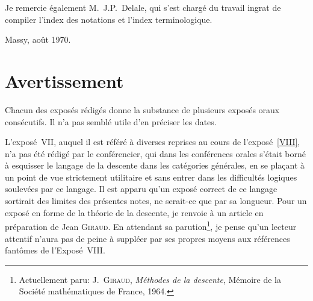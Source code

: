 Je remercie \'egalement M.\, J.P.\, Delale, qui s'est charg\'e du
travail ingrat de compiler l'index des notations et l'index
terminologique.

\bigskip\hfill Massy, ao\^ut 1970.

\cleardoublepage
\chapter*{Avertissement}
\thispagestyle{empty}
\label{I.avertissement}


Chacun des expos\'es r\'edig\'es donne la substance de plusieurs
expos\'es oraux cons\'ecutifs. Il n'a pas sembl\'e utile d'en
pr\'eciser les dates.

L'expos\'e~VII, auquel il est r\'ef\'er\'e \`a diverses
reprises au cours de l'expos\'e~\ref{VIII}, n'a pas \'et\'e
r\'edig\'e par le conf\'erencier, qui dans les conf\'erences
orales s'\'etait born\'e \`a esquisser le langage de la descente
dans les cat\'egories g\'en\'erales, en se pla\c cant \`a un
point de vue strictement utilitaire et sans entrer dans les
difficult\'es logiques soulev\'ees par ce langage. Il est apparu
qu'un expos\'e correct de ce langage sortirait des limites des
pr\'esentes notes, ne serait-ce que par sa longueur. Pour un
expos\'e en forme de la th\'eorie de la descente, je renvoie \`a
un article en pr\'eparation de Jean \textsc{Giraud}. En attendant sa
parution\footnote{\label{footnotegiraud}Actuellement paru: J.\, \textsc{Giraud},
\emph{Méthodes de la descente}, M\'emoire  de la
Soci\'et\'e math\'ematiques de France, 1964.}, je pense qu'un
lecteur attentif n'aura pas de peine \`a suppl\'eer par ses
propres moyens aux r\'ef\'erences fant\^omes de
l'Expos\'e~VIII.

